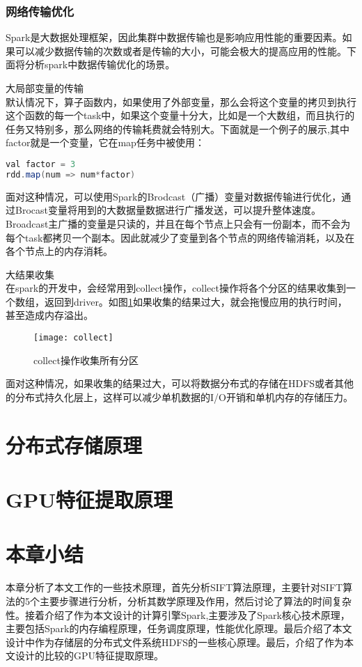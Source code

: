 \subsubsection{网络传输优化}
Spark是大数据处理框架，因此集群中数据传输也是影响应用性能的重要因素。如果可以减少数据传输的次数或者是传输的大小，可能会极大的提高应用的性能。下面将分析spark中数据传输优化的场景。
\begin{compactenum}
\item 大局部变量的传输\\默认情况下，算子函数内，如果使用了外部变量，那么会将这个变量的拷贝到执行这个函数的每一个task中，如果这个变量十分大，比如是一个大数组，而且执行的任务又特别多，那么网络的传输耗费就会特别大。下面就是一个例子的展示,其中factor就是一个变量，它在map任务中被使用：
\begin{lstlisting}[language=Java,numbers=none,frame=none]
val factor = 3
rdd.map(num => num*factor)
\end{lstlisting}

面对这种情况，可以使用Spark的Brodcast（广播）变量对数据传输进行优化，通过Brocast变量将用到的大数据量数据进行广播发送，可以提升整体速度。Broadcast主广播的变量是只读的，并且在每个节点上只会有一份副本，而不会为每个task都拷贝一个副本。因此就减少了变量到各个节点的网络传输消耗，以及在各个节点上的内存消耗。
\item 大结果收集\\在spark的开发中，会经常用到collect操作，collect操作将各个分区的结果收集到一个数组，返回到driver。如图\ref{fig:collect}如果收集的结果过大，就会拖慢应用的执行时间，甚至造成内存溢出。
\begin{figure}[htp]
\centering
\texttt{[image: collect]}
\caption{collect操作收集所有分区}
\label{fig:collect}
\end{figure}
面对这种情况，如果收集的结果过大，可以将数据分布式的存储在HDFS或者其他的分布式持久化层上，这样可以减少单机数据的I/O开销和单机内存的存储压力。
\end{compactenum}
\section{分布式存储原理}

\section{GPU特征提取原理}

\section{本章小结}
本章分析了本文工作的一些技术原理，首先分析SIFT算法原理，主要针对SIFT算法的5个主要步骤进行分析，分析其数学原理及作用，然后讨论了算法的时间复杂性。接着介绍了作为本文设计的计算引擎Spark,主要涉及了Spark核心技术原理，主要包括Spark的内存编程原理，任务调度原理，性能优化原理。最后介绍了本文设计中作为存储层的分布式文件系统HDFS的一些核心原理。最后，介绍了作为本文设计的比较的GPU特征提取原理。


